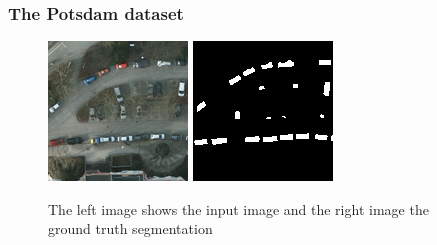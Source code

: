 \documentclass[aspectratio=1610]{beamer}
\begin{document}
\begin{frame}
  \frametitle{\hfill The Potsdam dataset}
\begin{figure}[H]
  \includegraphics[width=\linewidth]{trees}
\endminipage\hfill
{}
  \includegraphics[width=\linewidth]{trees_label}
\endminipage\hfill
\caption{The left image shows the input image and the right image the ground truth segmentation}
\end{figure}
\end{frame}
\end{document}
